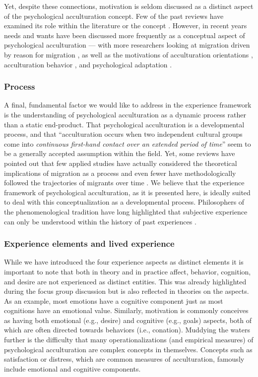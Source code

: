 \documentclass[man, 12pt, a4paper]{apa7}
\begin{document}
Yet, despite these connections, motivation is seldom discussed as a distinct aspect of the psychological acculturation concept. Few of the past reviews have examined its role within the literature or the concept \citep[including,][]{Ward2001a, Ward2019}. However, in recent years needs and wants have been discussed more frequently as a conceptual aspect of psychological acculturation --- with more researchers looking at migration driven by reason for migration \citep{Sandu2018}, as well as the motivations of acculturation orientations \citep{Recker2017a}, acculturation behavior \citep{Reece2000}, and psychological adaptation \citep{Safdar2003}. 

\subsubsection{Process}
A final, fundamental factor we would like to address in the experience framework is the understanding of psychological acculturation as a dynamic process rather than a static end-product. That psychological acculturation is a developmental process, and that ``acculturation occurs when two independent cultural groups come into \textit{continuous first-hand contact over an extended period of time}'' \citep[][186]{Berry1989} seem to be a generally accepted assumption within the field. Yet, some reviews have pointed out that few applied studies have actually considered the theoretical implications of migration as a process and even fewer have methodologically followed the trajectories of migrants over time \citep[][]{Brown2011, Ward2019}. We believe that the experience framework of psychological acculturation, as it is presented here, is ideally suited to deal with this conceptualization as a developmental process. Philosophers of the phenomenological tradition have long highlighted that subjective experience can only be understood within the history of past experiences \citep[e.g.,][]{Heidegger1867}. 

\subsubsection{Experience elements and lived experience}
While we have introduced the four experience aspects as distinct elements it is important to note that both in theory and in practice affect, behavior, cognition, and desire are not experienced as distinct entities. This was already highlighted during the focus group discussion but is also reflected in theories on the aspects. As an example, most emotions have a cognitive component just as most cognitions have an emotional value. Similarly, motivation is commonly conceives as having both emotional (e.g., desire) and cognitive (e.g., goals) aspects, both of which are often directed towards behaviors (i.e., conation). Muddying the waters further is the difficulty that many operationalizations (and empirical measures) of psychological acculturation are complex concepts in themselves. Concepts such as satisfaction or distress, which are common measures of acculturation, famously include emotional and cognitive components. 
\end{document}
